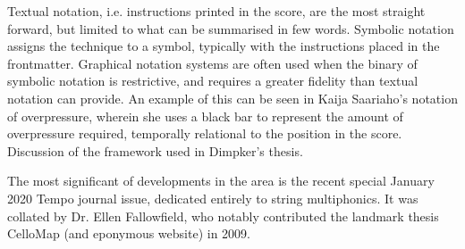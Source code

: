 Textual notation, i.e. instructions printed in the score, are the most straight forward, but limited to what can be summarised in few words.
Symbolic notation assigns the technique to a symbol, typically with the instructions placed in the frontmatter.
Graphical notation systems are often used when the binary of symbolic notation is restrictive, and requires a greater fidelity than textual notation can provide. 
An example of this can be seen in Kaija Saariaho's notation of overpressure, wherein she uses a black bar to represent the amount of overpressure required, temporally relational to the position in the score.
Discussion of the framework used in Dimpker's thesis.\autocite{dimpkerExtendedNotationDepiction2012}

The most significant of developments in the area is the recent special January 2020 Tempo journal issue, dedicated entirely to string multiphonics.
It was collated by Dr. Ellen Fallowfield, who notably contributed the landmark thesis CelloMap (and eponymous website) in 2009.\autocite{fallowfieldCelloMapHandbook2009}